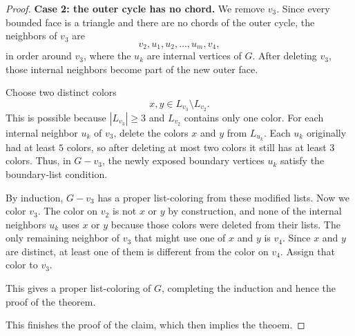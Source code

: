 \begin{proof}
    \textbf{Case 2: the outer cycle has no chord.} We remove $v_3$. Since every
    bounded face is a triangle and there are no chords of the outer cycle, the
    neighbors of $v_3$ are
    \[
        v_2, u_1,u_2,\ldots,u_m, v_4,
    \]
    in order around $v_3$, where the $u_k$ are internal vertices of $G$. After
    deleting $v_3$, those internal neighbors become part of the new outer face.
    \vspace{-4em}
    \begin{center}
    \end{center}
    \vspace{2em}

    Choose two distinct colors
    \[
        x,y\in L_{v_3}\setminus L_{v_2}.
    \]
    This is possible because $|L_{v_3}|\ge 3$ and $L_{v_2}$ contains only one color.
    For each internal neighbor $u_k$ of $v_3$, delete the colors $x$ and $y$ from
    $L_{u_k}$. Each $u_k$ originally had at least $5$ colors, so after deleting at
    most two colors it still has at least $3$ colors. Thus, in $G-v_3$, the newly
    exposed boundary vertices $u_k$ satisfy the boundary-list condition.

    By induction, $G-v_3$ has a proper list-coloring from these modified lists. Now
    we color $v_3$. The color on $v_2$ is not $x$ or $y$ by construction, and none
    of the internal neighbors $u_k$ uses $x$ or $y$ because those colors were
    deleted from their lists. The only remaining neighbor of $v_3$ that might use
    one of $x$ and $y$ is $v_4$. Since $x$ and $y$ are distinct, at least one of
    them is different from the color on $v_4$. Assign that color to $v_3$.

    This gives a proper list-coloring of $G$, completing the induction and hence
    the proof of the theorem.                       

    This finishes the proof of the claim, which then implies the theoem.
\end{proof}